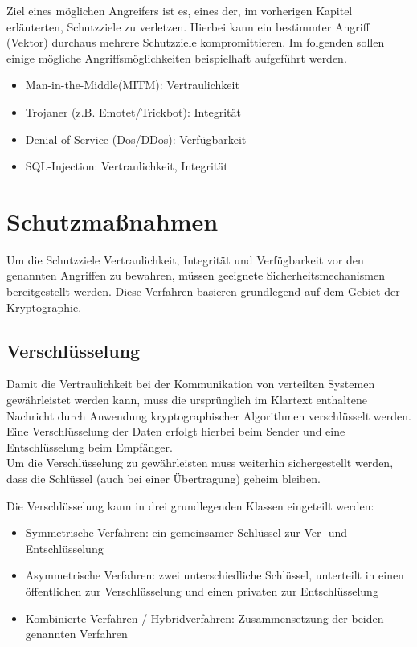 \documentclass[12pt,a4paper,parskip=half]{scrreprt}
\begin{document}
Ziel eines möglichen Angreifers ist es, eines der, im vorherigen Kapitel erläuterten, Schutzziele zu verletzen. Hierbei kann ein bestimmter Angriff (Vektor) durchaus mehrere Schutzziele kompromittieren. Im folgenden sollen einige mögliche Angriffsmöglichkeiten beispielhaft aufgeführt werden.

\begin{itemize}
	\item Man-in-the-Middle(MITM): Vertraulichkeit
	\item Trojaner (z.B. Emotet/Trickbot): Integrität
	\item Denial of Service (Dos/DDos): Verfügbarkeit
	\item SQL-Injection: Vertraulichkeit, Integrität
\end{itemize}



\section{Schutzmaßnahmen}

Um die Schutzziele Vertraulichkeit, Integrität und Verfügbarkeit vor den genannten Angriffen zu bewahren, müssen geeignete Sicherheitsmechanismen bereitgestellt werden. Diese Verfahren basieren grundlegend auf dem Gebiet der Kryptographie.

\subsection{Verschlüsselung}

Damit die Vertraulichkeit bei der Kommunikation von verteilten Systemen gewährleistet werden kann, muss die ursprünglich im Klartext enthaltene Nachricht durch Anwendung kryptographischer Algorithmen verschlüsselt werden. Eine Verschlüsselung der Daten erfolgt hierbei beim Sender und eine Entschlüsselung beim Empfänger. \\
Um die Verschlüsselung zu gewährleisten muss weiterhin sichergestellt werden, dass die Schlüssel (auch bei einer Übertragung) geheim bleiben.

Die Verschlüsselung kann in drei grundlegenden Klassen eingeteilt werden:
\begin{itemize}
	\item Symmetrische Verfahren: ein gemeinsamer Schlüssel zur Ver- und Entschlüsselung
	\item Asymmetrische Verfahren: zwei unterschiedliche Schlüssel, unterteilt in einen öffentlichen zur Verschlüsselung und einen privaten zur Entschlüsselung
	\item Kombinierte Verfahren / Hybridverfahren: Zusammensetzung der beiden genannten Verfahren
\end{itemize}
\end{document}

